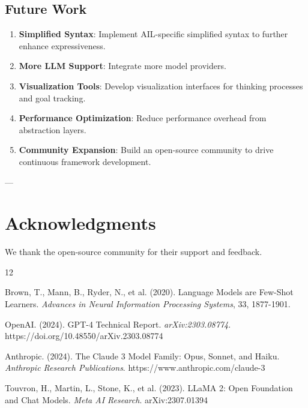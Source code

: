 \documentclass[12pt,a4paper]{article}
\begin{document}
\subsection{Future Work}

\begin{enumerate}
\item \textbf{Simplified Syntax}: Implement AIL-specific simplified syntax to further enhance expressiveness.
\item \textbf{More LLM Support}: Integrate more model providers.
\item \textbf{Visualization Tools}: Develop visualization interfaces for thinking processes and goal tracking.
\item \textbf{Performance Optimization}: Reduce performance overhead from abstraction layers.
\item \textbf{Community Expansion}: Build an open-source community to drive continuous framework development.
\end{enumerate}

---

\section*{Acknowledgments}

We thank the open-source community for their support and feedback.




\begin{thebibliography}{12}

Brown, T., Mann, B., Ryder, N., et al. (2020). Language Models are Few-Shot Learners. \textit{Advances in Neural Information Processing Systems}, 33, 1877-1901.

OpenAI. (2024). GPT-4 Technical Report. \textit{arXiv:2303.08774}. https://doi.org/10.48550/arXiv.2303.08774

Anthropic. (2024). The Claude 3 Model Family: Opus, Sonnet, and Haiku. \textit{Anthropic Research Publications}. https://www.anthropic.com/claude-3

Touvron, H., Martin, L., Stone, K., et al. (2023). LLaMA 2: Open Foundation and Chat Models. \textit{Meta AI Research}. arXiv:2307.01394

\end{thebibliography}
\end{document}
